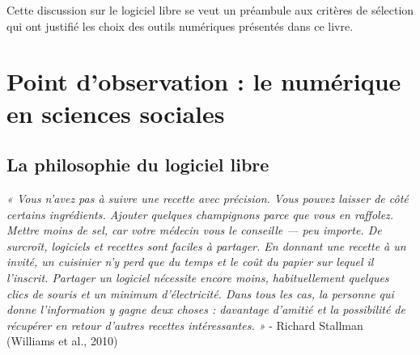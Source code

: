 \documentclass[
  letterpaper,
  DIV=11,
  numbers=noendperiod,
  oneside]{scrreprt}
\begin{document}
Cette discussion sur le logiciel libre se veut un préambule aux critères
de sélection qui ont justifié les choix des outils numériques présentés
dans ce livre.

\hypertarget{point-dobservation-le-numuxe9rique-en-sciences-sociales}{%
\section{Point d'observation : le numérique en sciences
sociales}\label{point-dobservation-le-numuxe9rique-en-sciences-sociales}}

\hypertarget{la-philosophie-du-logiciel-libre}{%
\subsection{La philosophie du logiciel
libre}\label{la-philosophie-du-logiciel-libre}}

\emph{« Vous n'avez pas à suivre une recette avec précision. Vous pouvez
laisser de côté certains ingrédients. Ajouter quelques champignons parce
que vous en raffolez. Mettre moins de sel, car votre médecin vous le
conseille --- peu importe. De surcroît, logiciels et recettes sont
faciles à partager. En donnant une recette à un invité, un cuisinier n'y
perd que du temps et le coût du papier sur lequel il l'inscrit. Partager
un logiciel nécessite encore moins, habituellement quelques clics de
souris et un minimum d'électricité. Dans tous les cas, la personne qui
donne l'information y gagne deux choses : davantage d'amitié et la
possibilité de récupérer en retour d'autres recettes intéressantes. »} -
Richard Stallman (Williams et al., 2010)
\end{document}

